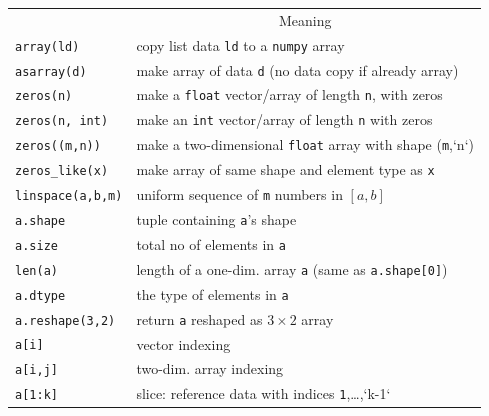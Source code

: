 \documentclass[graybox,envcountchap,sectrefs,final]{svmonodo}
\begin{document}
{\small   %

\vspace{4mm}

\begin{tabular}{ll}
\hline\noalign{\smallskip}
\multicolumn{1}{c}{ Construction } & \multicolumn{1}{c}{ Meaning } \\
\noalign{\smallskip}\svhline\noalign{\smallskip}
\texttt{array(ld)}               & copy list data \texttt{ld} to a \texttt{numpy} array                    \\
\texttt{asarray(d)}              & make array of data \texttt{d} (no data copy if already array)         \\
\texttt{zeros(n)}                & make a \texttt{float} vector/array of length \texttt{n}, with zeros     \\
\texttt{zeros(n, int)}           & make an \texttt{int} vector/array of length \texttt{n} with zeros       \\
\texttt{zeros((m,n))}            & make a two-dimensional \texttt{float} array with shape (\texttt{m},`n`) \\
\Verb!zeros_like(x)!           & make array of same shape and element type as \texttt{x}               \\
\texttt{linspace(a,b,m)}         & uniform sequence of \texttt{m} numbers in $[a,b]$                     \\
\texttt{a.shape}                 & tuple containing \texttt{a}'s shape                                   \\
\texttt{a.size}                  & total no of elements in \texttt{a}                                    \\
\texttt{len(a)}                  & length of a one-dim. array \texttt{a} (same as \texttt{a.shape[0]})     \\
\texttt{a.dtype}                 & the type of elements in \texttt{a}                                    \\
\texttt{a.reshape(3,2)}          & return \texttt{a} reshaped as $3\times 2$ array                       \\
\texttt{a[i]}                    & vector indexing                                                     \\
\texttt{a[i,j]}                  & two-dim. array indexing                                             \\
\texttt{a[1:k]}                  & slice: reference data with indices \texttt{1},\ldots,`k-1`            \\

\end{tabular}}
\end{document}

